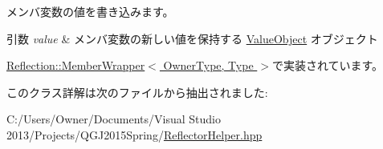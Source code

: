 メンバ変数の値を書き込みます。


\begin{DoxyParams}{引数}
{\em value} & メンバ変数の新しい値を保持する \hyperlink{class_reflection_1_1_value_object}{Value\+Object} オブジェクト\\
\hline
\end{DoxyParams}


\hyperlink{class_reflection_1_1_member_wrapper_a3cfbc4a9a4e9b3ffa6052c40e55d2bae}{Reflection\+::\+Member\+Wrapper$<$ Owner\+Type, Type $>$}で実装されています。



このクラス詳解は次のファイルから抽出されました\+:\begin{DoxyCompactItemize}
\item 
C\+:/\+Users/\+Owner/\+Documents/\+Visual Studio 2013/\+Projects/\+Q\+G\+J2015\+Spring/\hyperlink{_reflector_helper_8hpp}{Reflector\+Helper.\+hpp}\end{DoxyCompactItemize}
